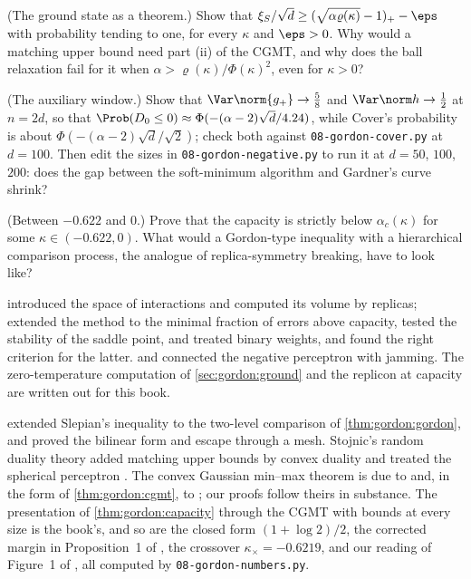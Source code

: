 \begin{refsection}
\begin{exercises}
\item \translate\hard (The ground state as a theorem.) Show that $\xi_S/\sqrt d\ge(\sqrt{\alpha\varrho(\kappa)}-1)_+-\eps$ with probability tending to one, for every $\kappa$ and $\eps>0$. Why would a matching upper bound need part (ii) of the CGMT, and why does the ball relaxation fail for it when $\alpha>\varrho(\kappa)/\Phi(\kappa)^2$, even for $\kappa>0$? \label{ex:gordon:groundstate}

\item \measurement (The auxiliary window.) Show that $\Var\norm{g_+}\to\frac58$ and $\Var\norm h\to\frac12$ at $n=2d$, so that $\Prob(D_0\le0)\approx\Phi(-(\alpha-2)\sqrt d/4.24)$, while Cover's probability is about $\Phi(-(\alpha-2)\sqrt d/\sqrt2)$; check both against \texttt{08-gordon-\allowbreak cover.py} at $d=100$. Then edit the sizes in \texttt{08-gordon-\allowbreak negative.py} to run it at $d=50$, $100$, $200$: does the gap between the soft-minimum algorithm and Gardner's curve shrink?\label{ex:gordon:window}

\item \research (Between $-0.622$ and $0$.) Prove that the capacity is strictly below $\alpha_c(\kappa)$ for some $\kappa\in(-0.622,0)$. What would a Gordon-type inequality with a hierarchical comparison process, the analogue of replica-symmetry breaking, have to look like?\label{ex:gordon:research}
\end{exercises}

\notesandrefs
\Textcite{Gardner1988} introduced the space of interactions and computed its volume by replicas; \textcite{GardnerDerrida1988} extended the method to the minimal fraction of errors above capacity, tested the stability of the saddle point, and treated binary weights, and \textcite{KrauthMezard1989} found the right criterion for the latter. \Textcite{FranzParisi2016} and \textcite{FranzEtAl2017} connected the negative perceptron with jamming. The zero-temperature computation of \cref{sec:gordon:ground} and the replicon at capacity are written out for this book.

\Textcite{Gordon1985} extended Slepian's inequality to the two-level comparison of \cref{thm:gordon:gordon}, and \textcite{Gordon1988} proved the bilinear form and escape through a mesh. Stojnic's random duality theory \parencite{Stojnic2013d} added matching upper bounds by convex duality and treated the spherical perceptron \parencite{Stojnic2013a,Stojnic2013b}. The convex Gaussian min--max theorem is due to \textcite{ThrampoulidisOymakHassibi2015} and, in the form of \cref{thm:gordon:cgmt}, to \textcite{ThrampoulidisAbbasiHassibi2018}; our proofs follow theirs in substance. The presentation of \cref{thm:gordon:capacity} through the CGMT with bounds at every size is the book's, and so are the closed form $(1+\log2)/2$, the corrected margin in Proposition~1 of \textcite{AltschulerTikhomirov2024}, the crossover $\kappa_\times=-0.6219$, and our reading of Figure~1 of \textcite{MontanariZhongZhou2024}, all computed by \texttt{08-gordon-\allowbreak numbers.py}.


\end{refsection}
